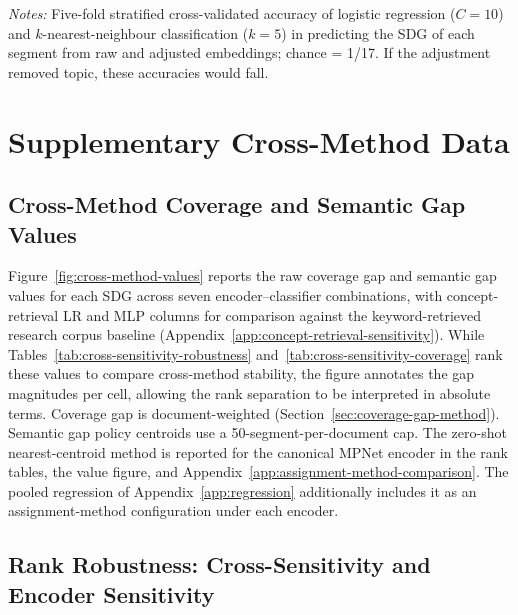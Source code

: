 \documentclass[12pt,a4paper]{article}
\let\OldSection\section
\renewcommand{\section}{\clearpage\FloatBarrier\OldSection}
\begin{document}
\begin{table}[ht]
\centering
\small
\caption{17-way SDG (topic) selectivity before and after register removal (original per-SDG-dedup sample, draw 1).}
\label{tab:register-validation-selectivity}
\resizebox{\textwidth}{!}{}
\par\smallskip\footnotesize\emph{Notes:} Five-fold stratified cross-validated accuracy of logistic regression ($C = 10$) and $k$-nearest-neighbour classification ($k = 5$) \parencite{CoverHart1967} in predicting the SDG of each segment from raw and adjusted embeddings; chance = 1/17. If the adjustment removed topic, these accuracies would fall.\par
\end{table}

\section{Supplementary Cross-Method Data}
\label{app:cross-method-section}

\subsection{Cross-Method Coverage and Semantic Gap Values}
\label{app:cross-method-gap-values}

Figure~\ref{fig:cross-method-values} reports the raw coverage gap and semantic gap values for each SDG across seven encoder--classifier combinations, with concept-retrieval LR and MLP columns for comparison against the keyword-retrieved research corpus baseline (Appendix~\ref{app:concept-retrieval-sensitivity}). While Tables~\ref{tab:cross-sensitivity-robustness} and~\ref{tab:cross-sensitivity-coverage} rank these values to compare cross-method stability, the figure annotates the gap magnitudes per cell, allowing the rank separation to be interpreted in absolute terms. Coverage gap is document-weighted (Section~\ref{sec:coverage-gap-method}). Semantic gap policy centroids use a 50-segment-per-document cap. The zero-shot nearest-centroid method is reported for the canonical MPNet encoder in the rank tables, the value figure, and Appendix~\ref{app:assignment-method-comparison}. The pooled regression of Appendix~\ref{app:regression} additionally includes it as an assignment-method configuration under each encoder.

\subsection{Rank Robustness: Cross-Sensitivity and Encoder Sensitivity}\label{sec:cross-sensitivity}
\end{document}
